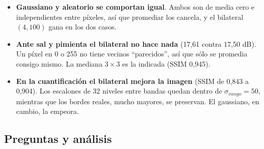         \begin{itemize}[label=\textbullet]
            \item \textbf{Gaussiano y aleatorio se comportan igual}. Ambos son de media cero e independientes entre píxeles, así que promediar los cancela, y el bilateral $(4, 100)$ gana en los dos casos.
            \item \textbf{Ante sal y pimienta el bilateral no hace nada} (17,61 contra 17,50 dB). Un píxel en 0 o 255 no tiene vecinos ``parecidos'', así que sólo se promedia consigo mismo. La mediana $3\times3$ es la indicada (SSIM 0,945).
            \item \textbf{En la cuantificación el bilateral mejora la imagen} (SSIM de 0,843 a 0,904). Los escalones de 32 niveles entre bandas quedan dentro de $\sigma_{rango}=50$, mientras que los bordes reales, mucho mayores, se preservan. El gaussiano, en cambio, la empeora.
        \end{itemize}

    \subsection{Preguntas y análisis}


